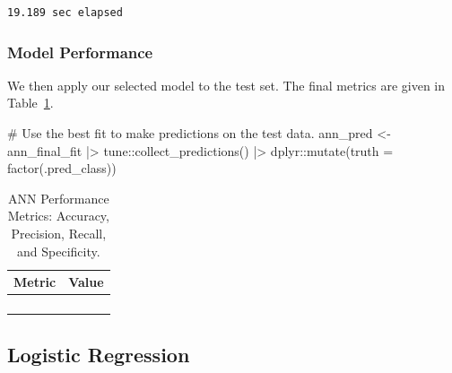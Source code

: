 \documentclass[
  letterpaper,
  DIV=11,
  numbers=noendperiod]{scrartcl}
\newenvironment{Shaded}{\begin{snugshade}}{\end{snugshade}}
\newcommand{\AttributeTok}[1]{\textcolor[rgb]{0.40,0.45,0.13}{#1}}
\newcommand{\CommentTok}[1]{\textcolor[rgb]{0.37,0.37,0.37}{#1}}
\newcommand{\FunctionTok}[1]{\textcolor[rgb]{0.28,0.35,0.67}{#1}}
\newcommand{\NormalTok}[1]{\textcolor[rgb]{0.00,0.23,0.31}{#1}}
\newcommand{\OtherTok}[1]{\textcolor[rgb]{0.00,0.23,0.31}{#1}}
\newcommand{\SpecialCharTok}[1]{\textcolor[rgb]{0.37,0.37,0.37}{#1}}
\begin{document}
\begin{verbatim}
19.189 sec elapsed
\end{verbatim}

\subsubsection{Model Performance}\label{model-performance-2}

We then apply our selected model to the test set. The final metrics are
given in Table~\ref{tbl-ann-performance-pdf}.

\begin{Shaded}
\begin{Highlighting}[]
\CommentTok{\# Use the best fit to make predictions on the test data.}
\NormalTok{ann\_pred }\OtherTok{\textless{}{-}} 
\NormalTok{  ann\_final\_fit }\SpecialCharTok{|\textgreater{}} 
\NormalTok{  tune}\SpecialCharTok{::}\FunctionTok{collect\_predictions}\NormalTok{() }\SpecialCharTok{|\textgreater{}}
\NormalTok{  dplyr}\SpecialCharTok{::}\FunctionTok{mutate}\NormalTok{(}\AttributeTok{truth =} \FunctionTok{factor}\NormalTok{(.pred\_class))}
\end{Highlighting}
\end{Shaded}

\begin{longtable}{>{\raggedright\arraybackslash}p{}>{\raggedleft\arraybackslash}p{}}

\caption{\label{tbl-ann-performance-pdf}ANN Performance Metrics:
Accuracy, Precision, Recall, and Specificity.}

\tabularnewline

\toprule
Metric & Value \\ 
\midrule\addlinespace[2.5pt]
\cellcolor[HTML]{FFFFFF}{Accuracy} & \cellcolor[HTML]{FFFFFF}{92.3} \\ 
\cellcolor[HTML]{FFFFFF}{Precision} & \cellcolor[HTML]{FFFFFF}{84.6} \\ 
\cellcolor[HTML]{FFFFFF}{Recall} & \cellcolor[HTML]{FFFFFF}{88.0} \\ 
\cellcolor[HTML]{FFFFFF}{Specificity} & \cellcolor[HTML]{FFFFFF}{93.9} \\ 
\bottomrule

\end{longtable}

\subsection{Logistic Regression}\label{logistic-regression}
\end{document}
